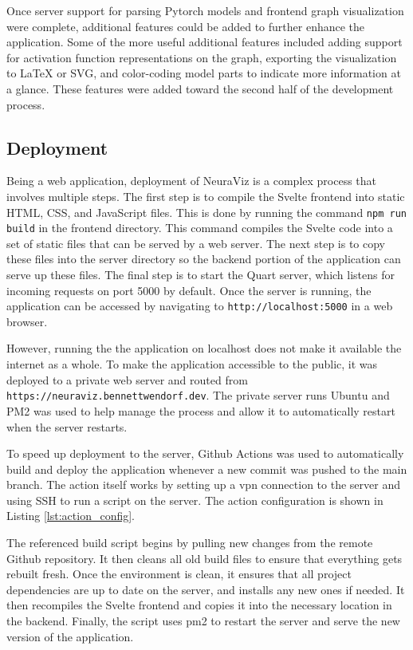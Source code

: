 Once server support for parsing Pytorch models and frontend graph visualization were complete, additional features could be added to further enhance the application. Some of the more useful additional features included adding support for activation function representations on the graph, exporting the visualization to LaTeX or SVG, and color-coding model parts to indicate more information at a glance. These features were added toward the second half of the development process.

\subsection{Deployment}
Being a web application, deployment of NeuraViz is a complex process that involves multiple steps. The first step is to compile the Svelte frontend into static HTML, CSS, and JavaScript files. This is done by running the command \texttt{npm run build} in the frontend directory. This command compiles the Svelte code into a set of static files that can be served by a web server. The next step is to copy these files into the server directory so the backend portion of the application can serve up these files. The final step is to start the Quart server, which listens for incoming requests on port 5000 by default. Once the server is running, the application can be accessed by navigating to \texttt{http://localhost:5000} in a web browser.

However, running the the application on localhost does not make it available the internet as a whole. To make the application accessible to the public, it was deployed to a private web server and routed from \texttt{https://neuraviz.bennettwendorf.dev}. The private server runs Ubuntu and PM2 \cite{pm2} was used to help manage the process and allow it to automatically restart when the server restarts.

To speed up deployment to the server, Github Actions was used to automatically build and deploy the application whenever a new commit was pushed to the main branch. The action itself works by setting up a vpn connection to the server and using SSH to run a script on the server. The action configuration is shown in Listing \ref{lst:action_config}.

\begin{center}
    
\end{center}

The referenced build script begins by pulling new changes from the remote Github repository. It then cleans all old build files to ensure that everything gets rebuilt fresh. Once the environment is clean, it ensures that all project dependencies are up to date on the server, and installs any new ones if needed. It then recompiles the Svelte frontend and copies it into the necessary location in the backend. Finally, the script uses pm2 to restart the server and serve the new version of the application.